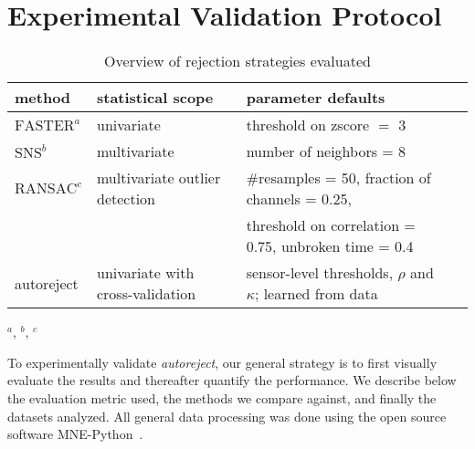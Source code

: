\section{Experimental Validation Protocol}

\begin{table}[tb]
{
    \caption{Overview of rejection strategies evaluated\label{tab:strategies}}
       \begin{center}
       \begin{tabular}{l l l l}
        \hline
        \textbf{method} & \textbf{statistical scope} & \textbf{parameter defaults}\\
        \hline
        $\text{FASTER}^{a}$ & univariate & threshold on zscore $=$ 3 \\
        $\text{SNS}^{b}$ & multivariate & number of neighbors = 8\\
        $\text{RANSAC}^{c}$ & multivariate outlier detection & \#resamples = 50, fraction of channels = 0.25,\\
        & & threshold on correlation = 0.75, unbroken time = 0.4 \\
        autoreject & univariate with cross-validation & sensor-level thresholds, $\rho$ and $\kappa$; learned from data \\
        \hline
        \end{tabular}
        \label{table:methods}
        \end{center}
        \hspace{1em}
        {\footnotesize
         $^a$\cite{nolan2010faster}, $^b$\cite{de2008sensor},  $^c$\cite{bigdely2015prep}}
}
\end{table}

To experimentally validate \emph{autoreject}, our general strategy is to first visually evaluate the results and thereafter quantify the performance. We describe below the evaluation metric used, the methods we compare against, and finally the datasets analyzed. All general data processing was done using the open source software MNE-Python~\citep{gramfort2013meg}.


